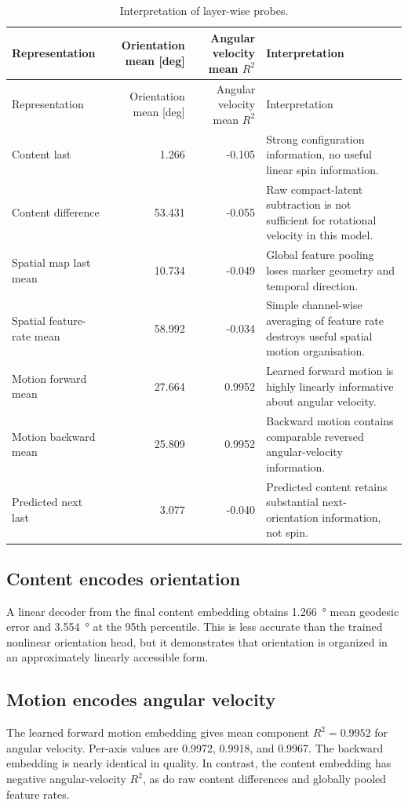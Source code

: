 \documentclass[11pt,a4paper]{article}
\begin{document}
\begin{landscape}
\begin{longtable}{p{}rrp{}}
\caption{Interpretation of layer-wise probes.}\label{tab:probes}\\
\toprule
Representation & Orientation mean [deg] & Angular velocity mean $R^2$ & Interpretation\\
\midrule
\endfirsthead
\toprule
Representation & Orientation mean [deg] & Angular velocity mean $R^2$ & Interpretation\\
\midrule
\endhead
Content last & 1.266 & -0.105 & Strong configuration information, no useful linear spin information.\\
Content difference & 53.431 & -0.055 & Raw compact-latent subtraction is not sufficient for rotational velocity in this model.\\
Spatial map last mean & 10.734 & -0.049 & Global feature pooling loses marker geometry and temporal direction.\\
Spatial feature-rate mean & 58.992 & -0.034 & Simple channel-wise averaging of feature rate destroys useful spatial motion organisation.\\
Motion forward mean & 27.664 & 0.9952 & Learned forward motion is highly linearly informative about angular velocity.\\
Motion backward mean & 25.809 & 0.9952 & Backward motion contains comparable reversed angular-velocity information.\\
Predicted next last & 3.077 & -0.040 & Predicted content retains substantial next-orientation information, not spin.\\
\bottomrule
\end{longtable}
\end{landscape}

\subsection{Content encodes orientation}
A linear decoder from the final content embedding obtains \SI{1.266}{\degree} mean geodesic error and \SI{3.554}{\degree} at the 95th percentile. This is less accurate than the trained nonlinear orientation head, but it demonstrates that orientation is organized in an approximately linearly accessible form.

\subsection{Motion encodes angular velocity}
The learned forward motion embedding gives mean component $R^2=0.9952$ for angular velocity. Per-axis values are 0.9972, 0.9918, and 0.9967. The backward embedding is nearly identical in quality. In contrast, the content embedding has negative angular-velocity $R^2$, as do raw content differences and globally pooled feature rates.
\end{document}
